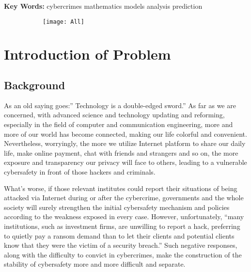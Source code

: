 \documentclass[12pt]{article}
\begin{document}
	\normalsize
	
	\textbf{Key Words:}
	cybercrimes  \quad  mathematics models  \quad   analysis \quad   prediction  
	
	\clearpage
	\pagestyle{fancy}
	\newpage
	\tableofcontents
	\newpage
		\setcounter{page}{1}
	\normalsize
	
	\begin{figure}[H]
		\begin{subfigure}
			\centering
			\texttt{[image: All]}
			\label{All}
		\end{subfigure}
		
	\end{figure}	
	
	
	\section{Introduction of Problem}
	\subsection{Background}
	As an old saying goes:” Technology is a double-edged sword.” As far as we are concerned, with advanced science and technology updating and reforming, especially in the field of computer and communication engineering, more and more of our world has become connected, making our life colorful and convenient. Nevertheless, worryingly, the more we utilize Internet platform to share our daily life, make online payment, chat with friends and strangers and so on, the more exposure and transparency our privacy will face to others, leading to a vulnerable cybersafety in front of those hackers and criminals.

	What’s worse, if those relevant institutes could report their situations of being attacked via Internet during or after the cybercrime, governments and the whole society will surely strengthen the initial cybersafety mechanism and policies according to the weakness exposed in every case. However, unfortunately, “many institutions, such as investment firms, are unwilling to report a hack, preferring to quietly pay a ransom demand than to let their clients and potential clients know that they were the victim of a security breach.” Such negative responses, along with the difficulty to convict in 
	cybercrimes\cite{CybercrimeOverview}, make the construction of the stability of cybersafety more and more difficult and separate.
\end{document}
